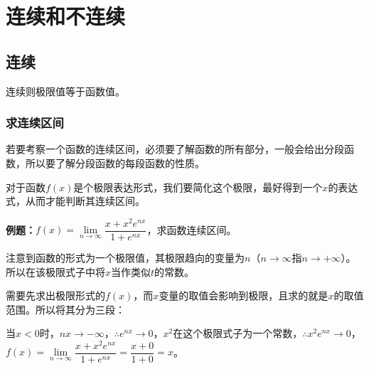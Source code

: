 \chapter{连续和不连续}\label{chap:连续和不连续}
%


\section{连续}

连续则极限值等于函数值。

\subsection{求连续区间}

若要考察一个函数的连续区间，必须要了解函数的所有部分，一般会给出分段函数，所以要了解分段函数的每段函数的性质。

对于函数$f(x)$是个极限表达形式，我们要简化这个极限，最好得到一个$x$的表达式，从而才能判断其连续区间。\medskip

\textbf{例题：}$f(x)=\lim\limits_{n\to\infty}\dfrac{x+x^2e^{nx}}{1+e^{nx}}$，求函数连续区间。\medskip

注意到函数的形式为一个极限值，其极限趋向的变量为$n$（$n\to\infty$指$n\to+\infty$）。所以在该极限式子中将$x$当作类似$t$的常数。

需要先求出极限形式的$f(x)$，而$x$变量的取值会影响到极限，且求的就是$x$的取值范围。所以将其分为三段：

当$x<0$时，$nx\to-\infty$，$\therefore e^{nx}\to 0$，$x^2$在这个极限式子为一个常数，$\therefore x^2e^{nx}\to 0$，$f(x)=\lim\limits_{n\to\infty}\dfrac{x+x^2e^{nx}}{1+e^{nx}}=\dfrac{x+0}{1+0}=x$。\medskip

